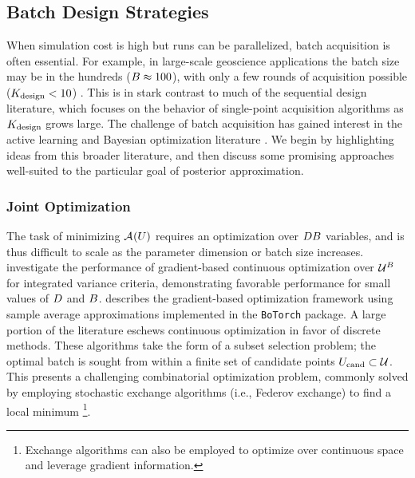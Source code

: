\documentclass[12pt]{article}
\begin{document}
\subsection{Batch Design Strategies}
When simulation cost is high but runs can be parallelized, batch acquisition is often essential. For example, in large-scale
geoscience applications the batch size may be in the hundreds ($\Nbatch \approx 100$), with only a few rounds 
of acquisition possible ($\Nrounds < 10$) \citep{FerEmulation}. This is in stark contrast to much of the sequential 
design literature, which focuses on the behavior of single-point acquisition algorithms as $\Nrounds$ grows large.
The challenge of batch acquisition has gained interest in the active learning and Bayesian 
optimization literature \citep{Ginsbourger2010,LOEPPKY20101452,Chevalier2013,batchBOThesis}. We begin 
by highlighting ideas from this broader literature, and then discuss some promising approaches
well-suited to the particular goal of posterior approximation.

\subsubsection{Joint Optimization}
The task of minimizing $\acq[](\parMat)$ requires an optimization over $\dimPar\Nbatch$ variables, and is thus
difficult to scale as the parameter dimension or batch size increases. \citet{Mercer_kernels_IVAR} investigate
the performance of gradient-based continuous optimization over $\parSpace^\Nbatch$ for integrated variance
criteria, demonstrating favorable performance for small values of $\dimPar$ and $\Nbatch$. 
\citep{botorch} describes the gradient-based optimization framework using sample average approximations
implemented in the \verb+BoTorch+ package. A large portion of the literature eschews continuous optimization in 
favor of discrete methods. These algorithms take the form of a subset selection problem; the optimal batch
is sought from within a finite set of candidate points $\parMatCand \subset \parSpace$. This presents a 
challenging combinatorial optimization problem, commonly solved by employing stochastic exchange 
algorithms (i.e., Federov exchange) to find a local minimum \citep{FederovExchange,WynnDiscreteExchange,LOEPPKY20101452}
\footnote{Exchange algorithms can also be employed to optimize over continuous space and leverage gradient information.}.
\end{document}
